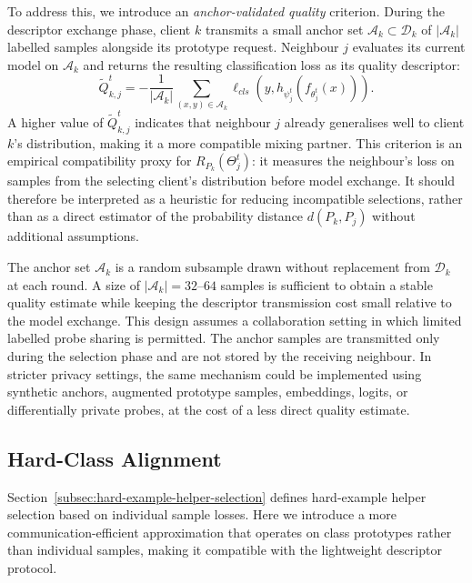 \documentclass[conference]{IEEEtran}
\newcommand{\rev}[1]{{\color{red}#1}}
\begin{document}
To address this, we introduce an \emph{anchor-validated quality} criterion. During the descriptor exchange phase, client \(k\) transmits a small anchor set \(\mathcal{A}_k \subset \mathcal{D}_k\) of \(|\mathcal{A}_k|\) labelled samples alongside its prototype request. Neighbour \(j\) evaluates its current model on \(\mathcal{A}_k\) and returns the resulting classification loss as its quality descriptor:
\begin{equation}
    \tilde{Q}_{k,j}^{t}
    =
    -\frac{1}{|\mathcal{A}_k|}
    \sum_{(x,y)\in\mathcal{A}_k}
    \ell_{cls}(y, h_{\psi_j^t}(f_{\theta_j^t}(x))).
    \label{eq:anchor_quality}
\end{equation}
A higher value of \(\tilde{Q}_{k,j}^t\) indicates that neighbour \(j\) already generalises well to client \(k\)'s distribution, making it a more compatible mixing partner. \rev{This criterion is an empirical compatibility proxy for \(R_{P_k}(\Theta_j^t)\): it measures the neighbour's loss on samples from the selecting client's distribution before model exchange. It should therefore be interpreted as a heuristic for reducing incompatible selections, rather than as a direct estimator of the probability distance \(d(P_k,P_j)\) without additional assumptions.}

The anchor set \(\mathcal{A}_k\) is a random subsample drawn without replacement from \(\mathcal{D}_k\) at each round. A size of \(|\mathcal{A}_k| = 32\)--\(64\) samples is sufficient to obtain a stable quality estimate while keeping the descriptor transmission cost small relative to the model exchange. This design assumes a collaboration setting in which limited labelled probe sharing is permitted. The anchor samples are transmitted only during the selection phase and are not stored by the receiving neighbour. In stricter privacy settings, the same mechanism could be implemented using synthetic anchors, augmented prototype samples, embeddings, logits, or differentially private probes, at the cost of a less direct quality estimate.

\subsection{Hard-Class Alignment}
\label{subsec:hard-class-alignment}
Section~\ref{subsec:hard-example-helper-selection} defines hard-example helper selection based on individual sample losses. Here we introduce a more communication-efficient approximation that operates on class prototypes rather than individual samples, making it compatible with the lightweight descriptor protocol.
\end{document}

